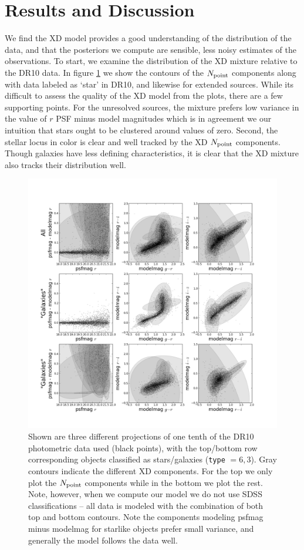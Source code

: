 \documentclass[12pt,preprint]{aastex}
\newcommand\ttt[1]{{\texttt{#1}}}
\begin{document}
\section{Results and Discussion}

We find the XD model provides a good understanding of the distribution of the 
data, and that the posteriors we compute are sensible, less noisy estimates of 
the observations.  To start, we examine the distribution of the XD mixture 
relative to the DR10 data.  In figure \ref{fig:contours} we show the contours 
of the $N_{\rm point}$ components along with data labeled as `star' in DR10,
and likewise for extended sources.  While its difficult to assess the quality
of the XD model from the plots, there are a few supporting points.  For the 
unresolved sources, the mixture prefers low variance in the value of $r$ PSF
minus model magnitudes which is in agreement we our intuition that stars
ought to be clustered around values of zero.  Second, the stellar locus in
color is clear and well tracked by the XD $N_{\rm point}$ components.  Though 
galaxies have less defining characteristics, it is clear that the XD mixture 
also tracks their distribution well.

\begin{figure}
\centering
\includegraphics[clip=true, trim=1.5cm 0.5cm 1.5cm 0.5cm,
  width=16cm]{fig1.png}
\caption{Shown are three different projections of one tenth of the DR10
photometric data used (black points), with the top/bottom row corresponding
objects classified as stars/galaxies (\ttt{type} $=6, 3$).  Gray contours
indicate the different XD components.  For the top we only plot the
$N_{\rm point}$ components while in the bottom we plot the rest.  Note,
however, when we compute our model we do not use SDSS classifications -- all
data is modeled with the combination of both top and bottom contours.  Note
the components modeling psfmag minus modelmag for starlike objects prefer
small variance, and generally the model follows the data well.
}
\label{fig:contours}
\end{figure}
\end{document}
